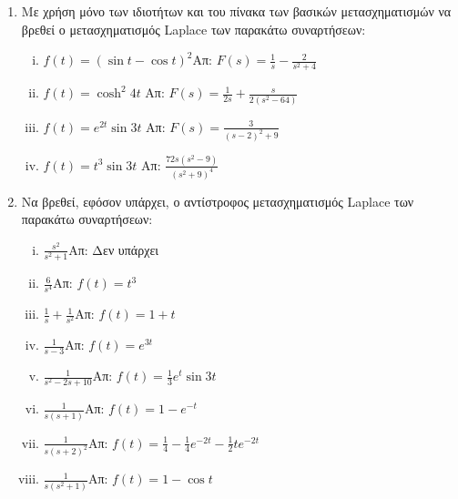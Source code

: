 



\everymath{\displaystyle}
\pagestyle{askhseis}



\begin{center}
  \minibox{\large\bf \textcolor{Col1}{Ασκήσεις στο Μετασχηματισμό Laplace}}
\end{center}

\vspace{\baselineskip}

\begin{enumerate}

  \item Με χρήση μόνο των ιδιοτήτων και του πίνακα των βασικών μετασχηματισμών να βρεθεί 
    ο μετασχηματισμός Laplace των παρακάτω συναρτήσεων:

    \begin{enumerate}[i)]
      \item $f(t)=(\sin t-\cos t)^2$\hfill Απ: $F(s)=\frac{1}{s}-\frac{2}{s^2+4}$
      \item $f(t)=\cosh^2 4t$ \hfill Απ: $F(s)=\frac{1}{2s}+\frac{s}{2(s^2-64)}$
      \item $f(t)=e^{2t}\sin 3t$ \hfill Απ: $F(s)=\frac{3}{(s-2)^2+9}$
      \item $f(t)=t^3\sin 3t$ \hfill Απ: $\frac{72s(s^2-9)}{(s^2+9)^4}$
    \end{enumerate}

  \item Να βρεθεί, εφόσον υπάρχει, ο αντίστροφος μετασχηματισμός Laplace των παρακάτω 
    συναρτήσεων:

    \begin{enumerate}[i)]
      \item $\frac{s^2}{s^2+1}$\hfill Απ: Δεν υπάρχει
      \item $\frac{6}{s^4}$\hfill Απ: $f(t)=t^3$
      \item $\frac{1}{s}+\frac{1}{s^2}$\hfill Απ: $f(t)=1+t$
      \item $\frac{1}{s-3}$\hfill Απ: $f(t)=e^{3t}$
      \item $\frac{1}{s^2-2s+10}$\hfill Απ: $f(t)=\frac{1}{3}e^t\sin 3t$
      \item $\frac{1}{s(s+1)}$\hfill Απ: $f(t)=1-e^{-t}$
      \item $\frac{1}{s(s+2)^2}$\hfill Απ: $f(t)=\frac{1}{4}-\frac{1}{4}e^{-2t}-
        \frac{1}{2}te^{-2t}$
      \item $\frac{1}{s(s^2+1)}$\hfill Απ: $f(t)=1-\cos t$
    \end{enumerate}


\end{enumerate}
